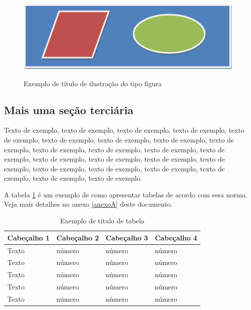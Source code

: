 \documentclass[
	12pt,				%
	oneside,			%
	a4paper,			%
	english,			%
	brazil				%
	]{abntex2ppgsi}
\begin{document}
\begin{figure}[htbp]
	\centering
	\caption{Exemplo de título de ilustração do tipo figura}
		\includegraphics{figura-exemplo.png}
	\label{fig:figura-exemplo3}
\end{figure}

\subsection{Mais uma seção terciária}

Texto de exemplo, texto de exemplo, texto de exemplo, texto de exemplo, texto de exemplo, texto de exemplo, texto de exemplo, texto de exemplo, texto de exemplo, texto de exemplo, texto de exemplo, texto de exemplo, texto de exemplo, texto de exemplo, texto de exemplo, texto de exemplo, texto de exemplo, texto de exemplo, texto de exemplo, texto de exemplo, texto de exemplo, texto de exemplo, texto de exemplo.

A tabela \ref{tab:ExemploDeTabela3} é um exemplo de como apresentar tabelas de acordo com essa norma. Veja mais detalhes no anexo \ref{anexoA} deste documento.

\begin{table}[htbp]
	\centering
	\caption{Exemplo de título de tabela}
		\begin{tabular}{p{0.85in} p{0.85in} p{0.85in} p{0.85in} } \hline
		
		Cabeçalho 1	& Cabeçalho 2	& Cabeçalho 3	& Cabeçalho 4 \\ \hline
		Texto	& número & número	& número \\ 
		Texto	& número & número	& número \\ 
		Texto	& número & número	& número \\ 
		Texto	& número & número	& número \\ 
		Texto	& número & número	& número \\ \hline
			
		\end{tabular}
	\label{tab:ExemploDeTabela3}
\end{table}
\end{document}
